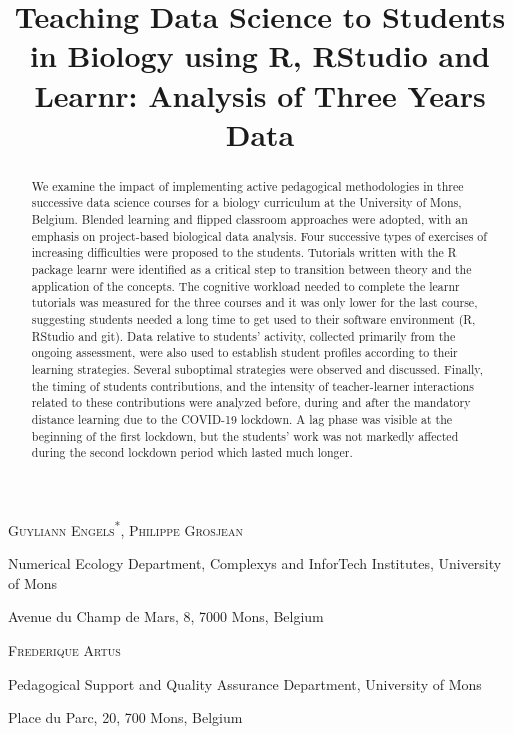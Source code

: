 \documentclass{aims}
\title[Teaching Data Science in
Biology] %
      {Teaching Data Science to Students in Biology using R, RStudio and
Learnr: Analysis of Three Years Data}
\author[Guyliann Engels, Philippe Grosjean and Frédérique Artus]{}
\theoremstyle{definition}
\begin{document}
\maketitle

\centerline{\scshape Guyliann Engels\textsuperscript{*}, Philippe Grosjean}
\medskip
{\footnotesize
 \centerline{Numerical Ecology Department, Complexys and InforTech Institutes, University of Mons}
   \centerline{Avenue du Champ de Mars, 8, 7000 Mons, Belgium}
} %

\medskip

\centerline{\scshape Frederique Artus}

\medskip
{\footnotesize
 \centerline{ Pedagogical Support and Quality Assurance Department, University of Mons}
   \centerline{Place du Parc, 20, 700 Mons, Belgium}
}

\bigskip



\begin{abstract}
  We examine the impact of implementing active pedagogical methodologies
  in three successive data science courses for a biology curriculum at
  the University of Mons, Belgium. Blended learning and flipped
  classroom approaches were adopted, with an emphasis on project-based
  biological data analysis. Four successive types of exercises of
  increasing difficulties were proposed to the students. Tutorials
  written with the R package learnr were identified as a critical step
  to transition between theory and the application of the concepts. The
  cognitive workload needed to complete the learnr tutorials was
  measured for the three courses and it was only lower for the last
  course, suggesting students needed a long time to get used to their
  software environment (R, RStudio and git). Data relative to students'
  activity, collected primarily from the ongoing assessment, were also
  used to establish student profiles according to their learning
  strategies. Several suboptimal strategies were observed and discussed.
  Finally, the timing of students contributions, and the intensity of
  teacher-learner interactions related to these contributions were
  analyzed before, during and after the mandatory distance learning due
  to the COVID-19 lockdown. A lag phase was visible at the beginning of
  the first lockdown, but the students' work was not markedly affected
  during the second lockdown period which lasted much longer.
\end{abstract}
\end{document}
